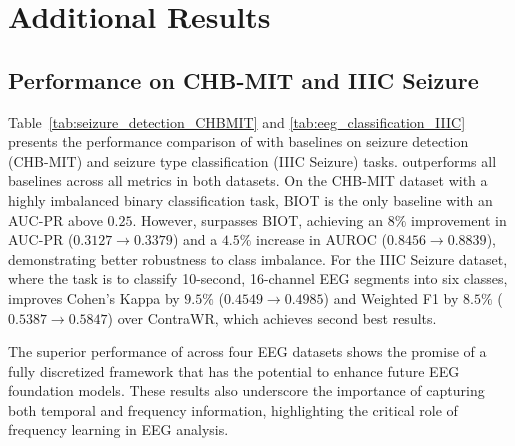 \section{Additional Results}

\subsection{Performance on CHB-MIT and IIIC Seizure}
\label{app:chbmit_iiic_comparison}

Table~\ref{tab:seizure_detection_CHBMIT} and \ref{tab:eeg_classification_IIIC} presents the performance comparison of \method with baselines on seizure detection (CHB-MIT) and seizure type classification (IIIC Seizure) tasks. \method outperforms all baselines across all metrics in both datasets. On the CHB-MIT dataset with a highly imbalanced binary classification task, BIOT is the only baseline with an AUC-PR above $0.25$.  However, \method surpasses BIOT, achieving an $8\%$ improvement in AUC-PR ($0.3127 \rightarrow 0.3379$) and a $4.5\%$ increase in AUROC ($0.8456 \rightarrow 0.8839$), demonstrating better robustness to class imbalance. For the IIIC Seizure dataset, where the task is to classify 10-second, 16-channel EEG segments into six classes, \method improves Cohen’s Kappa by $9.5\%$ ($0.4549 \rightarrow 0.4985$) and Weighted F1 by $8.5\%$ ($0.5387\rightarrow 0.5847$) over ContraWR, which achieves second best results. 

The superior performance of \method across four EEG datasets shows the promise of a fully discretized framework that has the potential to enhance future EEG foundation models. These results also underscore the importance of capturing both temporal and frequency information, highlighting the critical role of frequency learning in EEG analysis.



